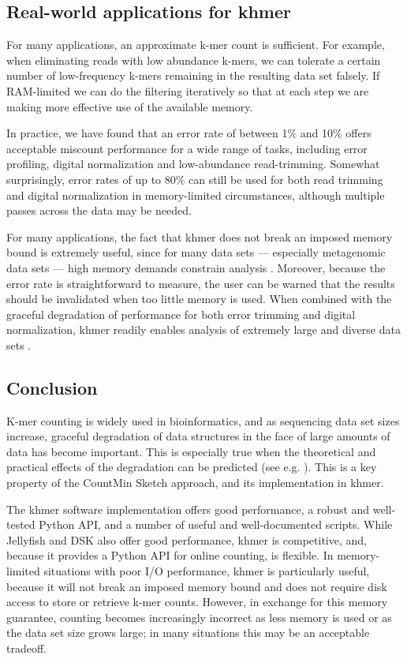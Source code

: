 \documentclass{article}
\begin{document}
\subsection{Real-world applications for khmer}

For many applications, an approximate k-mer count is sufficient.  For
example, when eliminating reads with low abundance k-mers, we
can tolerate a certain number of low-frequency k-mers remaining in
the resulting data set falsely.  If RAM-limited we can do the
filtering iteratively so that at each step we are making more
effective use of the available memory.

In practice, we have found that an error rate of between 1\%
and 10\% offers acceptable miscount performance for a wide range of
tasks, including error profiling, digital normalization and
low-abundance read-trimming.  Somewhat surprisingly, error
rates of up to 80\% can still be used for both read trimming and
digital normalization in memory-limited circumstances, although
multiple passes across the data may be needed.

For many applications, the fact that khmer does not break an imposed
memory bound is extremely useful, since for many data sets ---
especially metagenomic data sets --- high memory demands constrain analysis \cite{Howe2012,GAGE}.  Moreover, because the error
rate is straightforward to measure, the user can be warned that the
results should be invalidated when too little memory is used.  When combined
with the graceful degradation of performance for both error trimming
and digital normalization, khmer readily enables analysis of extremely
large and diverse data sets \cite{adina2013}.

\subsection{Conclusion}

K-mer counting is widely used in bioinformatics, and as sequencing data set sizes
increase, graceful degradation of data structures in the face of large
amounts of data has become important.  This is especially true when
the theoretical and practical effects of the degradation can be
predicted (see e.g. \cite{Melsted2011, Pell2012, Roy2013}).  This
is a key property of the CountMin Sketch
approach, and its implementation in khmer.

The khmer software implementation offers good performance, a robust
and well-tested Python API, and a number of useful and well-documented
scripts.  While Jellyfish and DSK also offer good performance,
khmer is competitive, and, because it provides a
Python API for online counting, is flexible.  In memory-limited
situations with poor I/O performance, khmer is particularly useful,
because it will not break an imposed memory bound and does not require
disk access to store or retrieve k-mer counts.  However, in exchange
for this memory guarantee, counting becomes increasingly incorrect as
less memory is used or as the data set size grows large; in many
situations this may be an acceptable tradeoff.
\end{document}
